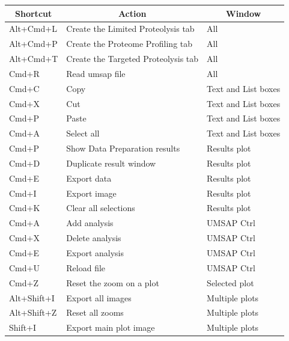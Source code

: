 \begin{table}[h!]
    \centering
    \begin{tabular}{l l l}
        \hline
        \multicolumn{1}{c}{Shortcut} & \multicolumn{1}{c}{Action}& \multicolumn{1}{c}{Window}\\
        \hline
        Alt+Cmd+L  &Create the Limited Proteolysis tab &All\\
        Alt+Cmd+P  &Create the Proteome Profiling tab  &All\\
        Alt+Cmd+T  &Create the Targeted Proteolysis tab&All\\
        Cmd+R      &Read umsap file                    &All\\
        Cmd+C      &Copy                               &Text and List boxes\\
        Cmd+X      &Cut                                &Text and List boxes\\
        Cmd+P      &Paste                              &Text and List boxes\\
        Cmd+A      &Select all                         &Text and List boxes\\
        Cmd+P      &Show Data Preparation results      &Results plot\\
        Cmd+D      &Duplicate result window            &Results plot\\
        Cmd+E      &Export data                        &Results plot\\
        Cmd+I      &Export image                       &Results plot\\
        Cmd+K      &Clear all selections               &Results plot\\
        Cmd+A      &Add analysis                       &UMSAP Ctrl\\
        Cmd+X      &Delete analysis                    &UMSAP Ctrl\\
        Cmd+E      &Export analysis                    &UMSAP Ctrl\\
        Cmd+U      &Reload file                        &UMSAP Ctrl\\
        Cmd+Z      &Reset the zoom       on a plot     &Selected plot\\
        Alt+Shift+I&Export all images                  &Multiple plots\\
        Alt+Shift+Z&Reset all zooms                    &Multiple plots\\
        Shift+I    &Export main plot image             &Multiple plots\\

\end{tabular}
\end{table}
